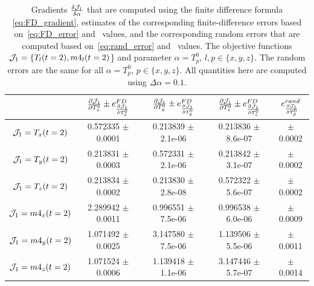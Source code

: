 \documentclass[times,final,nopreprintline]{elsarticle}
\begin{document}
 
\begin{table} %
\small
\setlength{\tabcolsep}{4pt}
\centering 
\begin{tabular}{|c|c|c|c|c|} 
  \hline
\rule{0pt}{10pt}  & $\frac{\partial \mathcal J_1}{\partial T_x^0} \pm e^{FD}_{\frac{\partial \mathcal J_1}{\partial T_x^0}}$ & $\frac{\partial \mathcal J_1}{\partial T_y^0} \pm e^{FD}_{\frac{\partial \mathcal J_1}{\partial T_y^0}}$ & $\frac{\partial \mathcal J_1}{\partial T_z^0} \pm e^{FD}_{\frac{\partial \mathcal J_1}{\partial T_z^0}}$ & $e^{rand}_{\frac{\partial \mathcal J_1}{\partial T_p^0}}$ \\ \hline
$\mathcal J_1=T_x(t=2)$  &  0.572335 $\pm$  0.0001  &  0.213839 $\pm$  2.1e-06  &  0.213836 $\pm$  8.6e-07 & $\pm$  0.0002 \\ %
$\mathcal J_1=T_y(t=2)$  &  0.213831 $\pm$  0.0003  &  0.572331 $\pm$  2.1e-06  &  0.213842 $\pm$  3.1e-07 & $\pm$  0.0002 \\
$\mathcal J_1=T_z(t=2)$  &  0.213834 $\pm$  0.0002  &  0.213830 $\pm$  2.8e-08  &  0.572322 $\pm$  5.6e-07 & $\pm$  0.0002 \\
$\mathcal J_1=m4_x(t=2)$ &  2.289942 $\pm$  0.0011  &  0.996551 $\pm$  7.5e-06  &  0.996538 $\pm$  6.0e-06 & $\pm$  0.0009 \\ %
$\mathcal J_1=m4_y(t=2)$ &  1.071492 $\pm$  0.0025  &  3.147580 $\pm$  7.5e-06  &  1.139506 $\pm$  5.5e-06 & $\pm$  0.0011 \\ %
$\mathcal J_1=m4_z(t=2)$ &  1.071524 $\pm$  0.0006  &  1.139418 $\pm$  1.1e-06  &  3.147446 $\pm$  5.7e-07 & $\pm$  0.0014 \\ 
   \hline
\end{tabular}
  \caption{Gradients $\frac{\delta \mathcal J_1}{\delta \alpha}$ that are computed using the finite difference formula \eqref{eq:FD_gradient}, estimates of the corresponding finite-difference errors based on~\eqref{eq:FD_error} and~ values, and the corresponding random errors that are computed based on~\eqref{eq:rand_error} and~ values. The objective functions $\mathcal J_1=\{T_l(t=2),m4_l(t=2)$\} and parameter $\alpha=T_p^0$, $l,p\in\{x,y,z\}$. The random errors are the same for all $\alpha=T_p^0$, $p\in\{x,y,z\}$. All quantities here are computed using $\Delta \alpha=0.1$.}\label{Table3}
\end{table}

\end{document}
